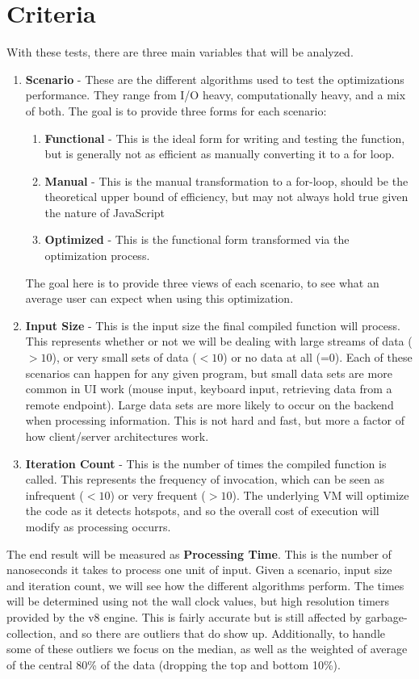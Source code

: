\section{Criteria}

With these tests, there are three main variables that will be analyzed.

\begin{enumerate}
  \item \textbf{Scenario} - These are the different algorithms used to test the optimizations performance. They range from I/O heavy, computationally heavy, and a mix of both.  The goal is to provide three forms for each scenario:
    \begin{enumerate}
      \item \textbf{Functional} - This is the ideal form for writing and testing the function, but is generally not as efficient as manually converting it to a for loop.
      \item \textbf{Manual} - This is the manual transformation to a for-loop, should be the theoretical upper bound of efficiency, but may not always hold true given the nature of JavaScript
      \item \textbf{Optimized} - This is the functional form transformed via the optimization process.  
    \end{enumerate}
  The goal here is to provide three views of each scenario, to see what an average user can expect when using this optimization.
  \item \textbf{Input Size} - This is the input size the final compiled function will process.  This represents whether or not we will be dealing with large streams of data ($> 10$), or very small sets of data ($< 10$) or no data at all (=0).  Each of these scenarios can happen for any given program, but small data sets are more common in UI work (mouse input, keyboard input, retrieving data from a remote endpoint).  Large data sets are more likely to occur on the backend when processing information. This is not hard and fast, but more a factor of how client/server architectures work. 
  \item \textbf{Iteration Count} - This is the number of times the compiled function is called.  This represents the frequency of invocation, which can be seen as infrequent ($< 10$) or very frequent ($> 10$).  The underlying VM will optimize the code as it detects hotspots, and so the overall cost of execution will modify as processing occurrs.  
\end{enumerate}

The end result will be measured as \textbf{Processing Time}. This is the number of nanoseconds it takes to process one unit of input.  Given a scenario, input size and iteration count, we will see how the different algorithms perform.   The times will be determined using not the wall clock values, but high resolution timers provided by the v8 engine.  This is fairly accurate but is still affected by garbage-collection, and so there are outliers that do show up.  Additionally, to handle some of these outliers we focus on the median, as well as the weighted of average of the central 80\% of the data (dropping the top and bottom 10\%).



